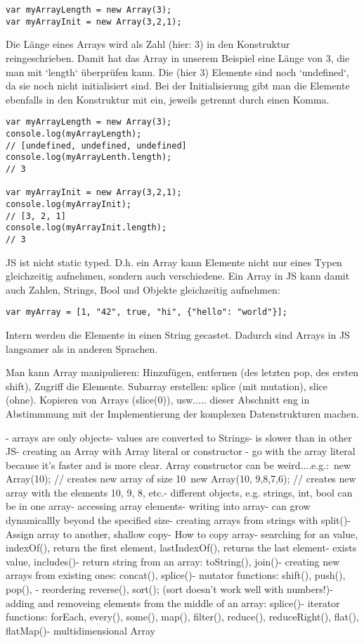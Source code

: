 \documentclass{book}
\begin{document}
\begin{lstlisting}[caption=Array Konstruktor]
var myArrayLength = new Array(3);
var myArrayInit = new Array(3,2,1);
\end{lstlisting}

Die Länge eines Arrays wird als Zahl (hier: 3) in den Konstruktur reingeschrieben. Damit hat das Array in unserem Beispiel eine Länge von 3, die man mit `length` überprüfen kann. Die (hier 3) Elemente sind noch `undefined`, da sie noch nicht initialisiert sind. Bei der Initialisierung gibt man die Elemente ebenfalls in den Konstruktur mit ein, jeweils getrennt durch einen Komma. 
\begin{lstlisting}[caption=Array Konstruktor]
var myArrayLength = new Array(3);
console.log(myArrayLength); 
// [undefined, undefined, undefined]
console.log(myArrayLenth.length); 
// 3

var myArrayInit = new Array(3,2,1);
console.log(myArrayInit); 
// [3, 2, 1]
console.log(myArrayInit.length); 
// 3
\end{lstlisting}

JS ist nicht static typed. D.h. ein Array kann Elemente nicht nur eines Typen gleichzeitig aufnehmen, sondern auch verschiedene. Ein Array in JS kann damit auch Zahlen, Strings, Bool und Objekte gleichzeitig aufnehmen:

\begin{lstlisting}[caption=Array Konstruktor]
var myArray = [1, "42", true, "hi", {"hello": "world"}];
\end{lstlisting}

Intern werden die Elemente in einen String gecastet. Dadurch sind Arrays in JS langsamer als in anderen Sprachen. 

Man kann 
Array manipulieren: Hinzufügen, entfernen (des letzten pop, des ersten shift), Zugriff die Elemente. Subarray erstellen: splice (mit mutation), slice (ohne). Kopieren von Arrays (slice(0)), usw..... dieser Abschnitt eng in Abstimmmung mit der Implementierung der komplexen Datenstrukturen machen.

- arrays are only objects- values are converted to Strings- is slower than in other JS- creating an Array with Array literal or constructor - go with the array literal because it's faster and is more clear. Array constructor can be weird....e.g.: new Array(10); // creates new array of size 10 new Array(10, 9,8,7,6); // creates new array with the elements 10, 9, 8, etc.- different objects, e.g. strings, int, bool can be in one array- accessing array elements- writing into array- can grow dynamicallly beyond the specified size- creating arrays from strings with split()- Assign array to another, shallow copy- How to copy array- searching for an value, indexOf(), return the first element, lastIndexOf(), returns the last element- exists value, includes()- return string from an array: toString(), join()- creating new arrays from existing ones: concat(), splice()- mutator functions: shift(), push(), pop(), - reordering reverse(), sort(); (sort doesn't work well with numbers!)- adding and removeing elements from the middle of an array: splice()- iterator functions: forEach, every(), some(), map(), filter(), reduce(), reduceRight(), flat(), flatMap()- multidimensional Array
\end{document}
